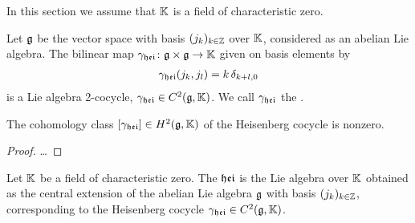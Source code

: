 In this section we assume that $\mathbb{K}$ is a field of characteristic zero.

\begin{definition}
  \label{def:HeisenbergCocycle}
  \leanok
  Let $\mathfrak{g}$ be the vector space with basis $(j_k)_{k \in \mathbb{Z}}$ over $\mathbb{K}$,
  considered as an abelian Lie algebra.
  The bilinear map $\gamma_{\mathfrak{hei}} \colon \mathfrak{g} \times \mathfrak{g} \to \mathbb{K}$
  given on basis elements by
  \begin{align*}
    \gamma_{\mathfrak{hei}}(j_k, j_l) = k \, \delta_{k+l,0}
  \end{align*}
  is a Lie algebra 2-cocycle, $\gamma_{\mathfrak{hei}} \in C^2(\mathfrak{g},\mathbb{K})$.
  We call $\gamma_{\mathfrak{hei}}$ the .
\end{definition}

\begin{lemma}
  \label{lem:HeisenbergCocycleNontrivial}
  \leanok
  The cohomology class $[\gamma_{\mathfrak{hei}}] \in H^2(\mathfrak{g},\mathbb{K})$
  of the Heisenberg cocycle is nonzero.
\end{lemma}
\begin{proof}
  \leanok
  \ldots
\end{proof}

\begin{definition}
  \label{def:HeisenbergAlgebra}
  \leanok
  Let $\mathbb{K}$ be a field of characteristic zero.
  The  $\mathfrak{hei}$ is the Lie algebra over $\mathbb{K}$
  obtained as the central extension of the abelian Lie algebra $\mathfrak{g}$
  with basis $(j_k)_{k \in \mathbb{Z}}$,
  corresponding to the Heisenberg cocycle $\gamma_{\mathfrak{hei}} \in C^2(\mathfrak{g},\mathbb{K})$.
\end{definition}
